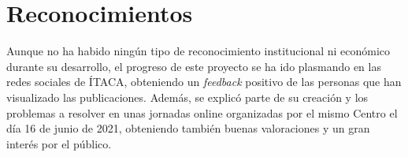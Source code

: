 \section{Reconocimientos}

Aunque no ha habido ningún tipo de reconocimiento institucional ni económico durante su desarrollo, el progreso de este proyecto se ha ido plasmando en las redes sociales de ÍTACA, obteniendo un \textit{feedback} positivo de las personas que han visualizado las publicaciones. Además, se explicó parte de su creación y los problemas a resolver en unas jornadas online organizadas por el mismo Centro el día 16 de junio de 2021, obteniendo también buenas valoraciones y un gran interés por el público.